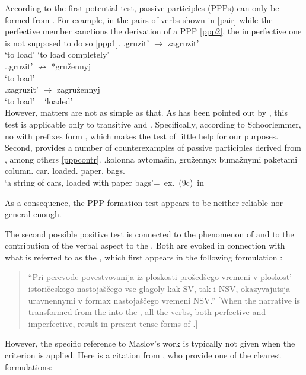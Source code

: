 According to the first potential test,  passive participles (PPPs) can only be formed from . For example, in the pairs of verbs shown in \ref{pair} while the perfective member sanctions the derivation of a PPP \ref{ppp2}, the imperfective one is not supposed to do so \ref{ppp1}.
\exg.\label{pair}{gruzit'\textsuperscript{\IPF}} {$\rightarrow$} zagruzit'\textsuperscript{\PF}\\
{`to load'} {} {`to load completely'}\\

\ex.\ag.\label{ppp1}gruzit'\textsuperscript{\IPF} $\nrightarrow$ *gru\v{z}ennyj\\
{`to load'} {~} {~}\\
\bg.\label{ppp2}zagruzit'\textsuperscript{\PF} {$\rightarrow$} zagru\v{z}ennyj\\
{`to load'} {~} {`loaded'}\\

However, matters are not as simple as that. As has been pointed out by \citet{Schoorlemmer:95}, this test is applicable only to transitive and . Specifically, according to Schoorlemmer, no  with  prefixes form , which makes the test of little help for our purposes. Second, \citet{Romanova:06} provides a number of counterexamples of  passive participles derived from , among others \ref{pppcontr}.
\exg.\label{pppcontr}kolonna avtoma\v{s}in, gru\v{z}ennyx buma\v{z}nymi paketami \\
column. car. loaded. paper. bags.\\
\trans `a string of cars, loaded with paper bags'\hfill\hbox{= ex. (9c) in \citet[5]{Romanova:06}}

As a consequence, the PPP formation test appears to be neither reliable nor general enough.\largerpage

The second possible positive test is connected to the phenomenon of  and to the contribution of the verbal aspect to the . Both are evoked in connection with what is referred to as the \textit{,} which first appears in the following formulation \citep[][76--77]{Maslov:04}: 
\begin{quote}
``Pri perevode povestvovanija iz ploskosti pro\v{s}ed\v{s}ego vremeni v ploskost' istori\v{c}eskogo nastoja\v{s}\v{c}ego vse glagoly kak SV, tak i NSV, okazyvajutsja uravnennymi v formax nastoja\v{s}\v{c}ego vremeni NSV.'' [When the narrative is transformed from the  into the , all the verbs, both perfective and imperfective, result in present tense forms of .] 
\end{quote}
However, the specific reference to Maslov's work is typically not given when the criterion is applied. Here is a citation from \citet[1]{Mikaelian:07}, who provide one of the clearest formulations:

